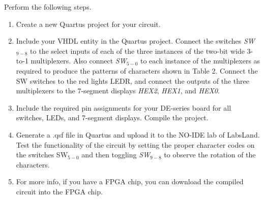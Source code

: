 \documentclass[epsfig,10pt,fullpage]{article}
\begin{document}
Perform the following steps.
\begin{enumerate}
\item Create a new Quartus  project for your circuit.
\item Include your VHDL entity in the Quartus  project. Connect the switches 
{\it SW}$_{9-8}$ to the select inputs of each of the three instances of the two-bit 
wide 3-to-1 multiplexers. Also connect {\it SW}$_{5-0}$ to each instance of the
multiplexers as required to produce the patterns of characters shown in Table 2.
Connect the SW switches to the red lights LEDR, and connect the outputs of the three 
multiplexers to the 7-segment displays {\it HEX2}, {\it HEX1}, and {\it HEX0}.
\item Include the required pin assignments for your DE-series board for all switches, LEDs, 
and 7-segment displays. Compile the project.
\item Generate a .qsf file in Quartus and upload it to the NO-IDE lab of LabsLand. Test the functionality of the 
circuit by setting the proper character codes on the switches SW$_{5-0}$ and then 
toggling {\it SW}$_{9-8}$ to observe the rotation of the characters.
\item For more info, if you have a FPGA chip, you can download the compiled circuit into the FPGA chip.
\end{enumerate}
\end{document}
